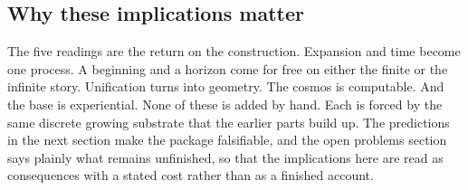 \subsection{Why these implications matter}

The five readings are the return on the construction. Expansion and time become one process. A beginning and a horizon come for free on either the finite or the infinite story. Unification turns into geometry. The cosmos is computable. And the base is experiential. None of these is added by hand. Each is forced by the same discrete growing substrate that the earlier parts build up. The predictions in the next section make the package falsifiable, and the open problems section says plainly what remains unfinished, so that the implications here are read as consequences with a stated cost rather than as a finished account.
